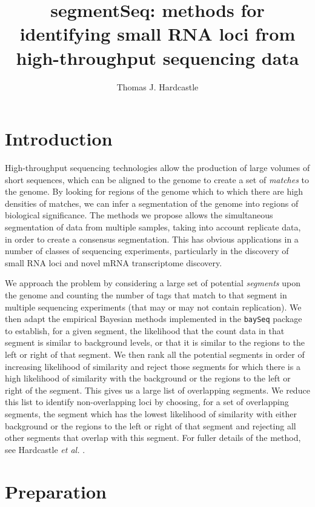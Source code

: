 \documentclass[a4paper]{article}
\title{segmentSeq: methods for identifying small RNA loci from high-throughput sequencing data}
\author{Thomas J. Hardcastle}
\begin{document}
\maketitle

\section{Introduction}

High-throughput sequencing technologies allow the production of large volumes of short sequences, which can be aligned to the genome to create a set of \textsl{matches} to the genome. By looking for regions of the genome which to which there are high densities of matches, we can infer a segmentation of the genome into regions of biological significance. The methods we propose allows the simultaneous segmentation of data from multiple samples, taking into account replicate data, in order to create a consensus segmentation. This has obvious applications in a number of classes of sequencing experiments, particularly in the discovery of small RNA loci and novel mRNA transcriptome discovery.

We approach the problem by considering a large set of potential \textsl{segments} upon the genome and counting the number of tags that match to that segment in multiple sequencing experiments (that may or may not contain replication). We then adapt the empirical Bayesian methods implemented in the \verb'baySeq' package \cite{Hardcastle:2010} to establish, for a given segment, the likelihood that the count data in that segment is similar to background levels, or that it is similar to the regions to the left or right of that segment. We then rank all the potential segments in order of increasing likelihood of similarity and reject those segments for which there is a high likelihood of similarity with the background or the regions to the left or right of the segment. This gives us a large list of overlapping segments. We reduce this list to identify non-overlapping loci by choosing, for a set of overlapping segments, the segment which has the lowest likelihood of similarity with either background or the regions to the left or right of that segment and rejecting all other segments that overlap with this segment. For fuller details of the method, see Hardcastle \textsl{et al.} \cite{Hardcastle:2011}.

\section{Preparation}
\end{document}

